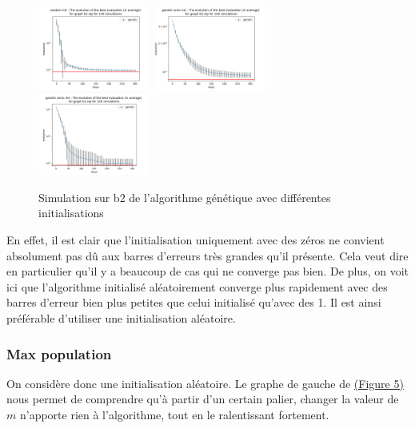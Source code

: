 \documentclass[11pt,french]{report}
\begin{document}
        \begin{figure}
          \includegraphics[width=0.33\textwidth]{best_b2_evaluation_genetic random init.png}
          \includegraphics[width=0.33\textwidth]{best_b2_evaluation_genetic ones init.png}
          \includegraphics[width=0.32\textwidth]{best_b2_evaluation_genetic zeros init.png}
          \caption{Simulation sur b2 de l'algorithme génétique avec différentes initialisations}
          \label{Figure4}
        \end{figure}
        

        En effet, il est clair que l'initialisation uniquement avec des zéros ne convient absolument pas dû aux barres d'erreurs très grandes qu'il présente. Cela veut dire en particulier qu'il y a beaucoup de cas qui ne converge pas bien. De plus, on voit ici que l'algorithme initialisé aléatoirement converge plus rapidement avec des barres d'erreur bien plus petites que celui initialisé qu'avec des 1.
        Il est ainsi préférable d'utiliser une initialisation aléatoire.

        \subsubsection{Max population}
        On considère donc une initialisation aléatoire. Le graphe de gauche de  \hyperref[Figure5]{(Figure 5)} nous permet de comprendre qu'à partir d'un certain palier, changer la valeur de \hyperref[sélection]{$m$} n'apporte rien à l'algorithme, tout en le ralentissant fortement.
\end{document}
